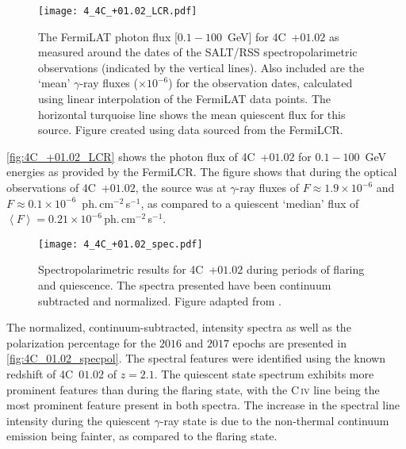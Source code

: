 \begin{figure}[t]
    \centering
    \texttt{[image: 4\_4C\_+01.02\_LCR.pdf]}
    \caption{The \gls{FermiLAT} photon flux [$0.1 - 100$~GeV] for 4C~+$01.02$ as measured around the dates of the \gls{SALT}/\gls{RSS} spectropolarimetric observations (indicated by the vertical lines). Also included are the `mean' $\gamma$-ray fluxes ($\times 10^{-6}$) for the observation dates, calculated using linear interpolation of the \gls{FermiLAT} data points. The horizontal turquoise line shows the mean quiescent flux for this source. Figure created using data sourced from the \gls{FermiLCR}.\protect\footnotemark}
    \label{fig:4C_+01.02_LCR}
\end{figure}

\autoref{fig:4C_+01.02_LCR} shows the photon flux of 4C~+$01.02$ for $0.1 - 100$~GeV energies as provided by the \gls{FermiLCR}.
The figure shows that during the optical observations of 4C~+$01.02$, the source was at $\gamma$-ray fluxes of $F \approx 1.9 \times 10^{-6}$ and $F \approx 0.1 \times 10^{-6}$~ph.\,cm$^{-2}$\,s$^{-1}$, as compared to a quiescent `median' flux of $\left\langle F \right\rangle = 0.21 \times 10^{-6}$\,ph.\,cm$^{-2}$\,s$^{-1}$.

\begin{figure}[t]
    \centering
    \texttt{[image: 4\_4C\_+01.02\_spec.pdf]}
    \caption{Spectropolarimetric results for 4C~+$01.02$ during periods of flaring and quiescence. The spectra presented have been continuum subtracted and normalized. Figure adapted from \citep{Schutte4C0102}.}
    \label{fig:4C_01.02_specpol}
\end{figure}


The normalized, continuum-subtracted, intensity spectra as well as the polarization percentage for the $2016$ and $2017$ epochs are presented in \autoref{fig:4C_01.02_specpol}.
The spectral features were identified using the known redshift of 4C~$01.02$ of $z = 2.1$.
The quiescent state spectrum exhibits more prominent features than during the flaring state, with the C\,\textsc{iv} line being the most prominent feature present in both spectra.
The increase in the spectral line intensity during the quiescent $\gamma$-ray state is due to the non-thermal continuum emission being fainter, as compared to the flaring state.

